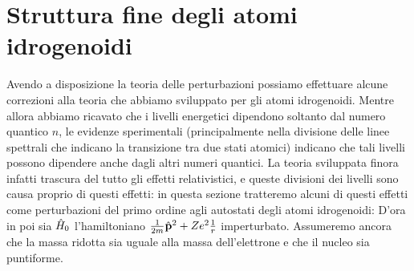 \section{Struttura fine degli atomi idrogenoidi}
Avendo a disposizione la teoria delle perturbazioni possiamo effettuare alcune correzioni alla teoria che abbiamo sviluppato per gli atomi idrogenoidi.
Mentre allora abbiamo ricavato che i livelli energetici dipendono soltanto dal numero quantico $n$, le evidenze sperimentali (principalmente nella divisione delle linee spettrali che indicano la transizione tra due stati atomici) indicano che tali livelli possono dipendere anche dagli altri numeri quantici.
La teoria sviluppata finora infatti trascura del tutto gli effetti relativistici, e queste divisioni dei livelli sono causa proprio di questi effetti: in questa sezione tratteremo alcuni di questi effetti come perturbazioni del primo ordine agli autostati degli atomi idrogenoidi:
D'ora in poi sia $\hat{H}_0$ l'hamiltoniano $\frac1{2m}\hat{\mathbf{p}}^2+Ze^2\frac1{r}$ imperturbato.
Assumeremo ancora che la massa ridotta sia uguale alla massa dell'elettrone e che il nucleo sia puntiforme.

